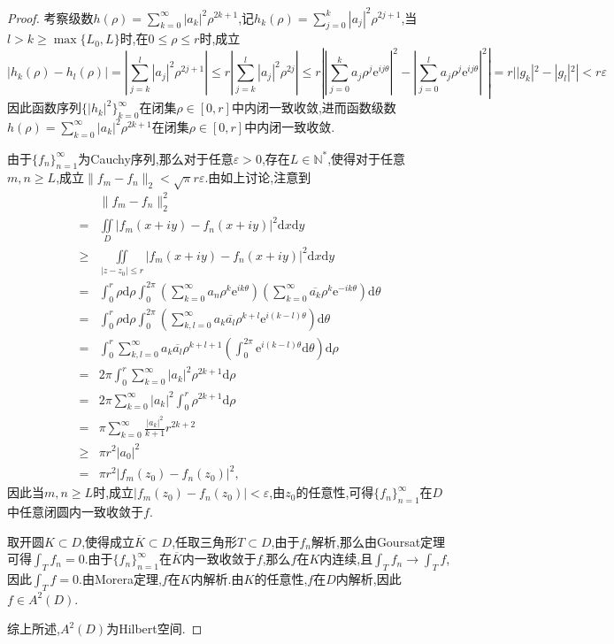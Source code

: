 \documentclass[lang = cn, scheme = chinese]{elegantbook}
\begin{document}
\begin{proof}
		考察级数$\displaystyle h(\rho)=\sum_{k=0}^{\infty}|a_k|^2\rho^{2k+1}$,记$\displaystyle h_k(\rho)=\sum_{j=0}^{k}|a_j|^2\rho^{2j+1}$,当$l>k\ge \max\{ L_0,L \}$时,在$0\le \rho \le r$时,成立
		$$
		|h_k(\rho)-h_l(\rho)|
		=\left| \sum_{j=k}^{l}|a_j|^2\rho^{2j+1} \right|
		\le r\left| \sum_{j=k}^{l}|a_j|^2\rho^{2j} \right|
		\le r\left| \left| \sum_{j=0}^{k}a_j\rho^j\mathrm{e}^{ij\theta} \right|^2-\left| \sum_{j=0}^{l}a_j\rho^j\mathrm{e}^{ij\theta} \right|^2 \right|
		= r||g_k|^2-|g_l|^2|<r\varepsilon
		$$
		因此函数序列$\{|h_k|^2\}_{k=0}^{\infty}$在闭集$\rho\in[0,r]$中内闭一致收敛,进而函数级数$\displaystyle h(\rho)=\sum_{k=0}^{\infty}|a_k|^2\rho^{2k+1}$在闭集$\rho\in[0,r]$中内闭一致收敛.
		
		由于$\{f_n\}_{n=1}^{\infty}$为Cauchy序列,那么对于任意$\varepsilon>0$,存在$L\in\mathbb{N}^*$,使得对于任意$m,n\ge L$,成立$\| f_m-f_n\|_2<\sqrt{\pi}r\varepsilon$.由如上讨论,注意到
		\begin{align*}
			&\|f_m-f_n\|_2^2\\
			=&\iint\limits_D |f_m(x+iy)-f_n(x+iy)|^2\mathrm{d}x\mathrm{d}y\\
			\ge & \iint\limits_{|z-z_0|\le r} |f_m(x+iy)-f_n(x+iy)|^2\mathrm{d}x\mathrm{d}y\\
			= & \int_0^r\rho\mathrm{d}\rho\int_0^{2\pi}\left(\sum_{k=0}^{\infty}a_n\rho^{k}\mathrm{e}^{ik\theta}\right)\left(\sum_{k=0}^{\infty}\overline{a_k}\rho^{k}\mathrm{e}^{-ik\theta}\right)\mathrm{d}\theta\\
			= & \int_0^r\rho\mathrm{d}\rho\int_0^{2\pi} \left(\sum_{k,l=0}^{\infty}a_k\overline{a_l}\rho^{k+l}\mathrm{e}^{i(k-l)\theta}\right)\mathrm{d}\theta\\
			= & \int_0^r\sum_{k,l=0}^{\infty}a_k\overline{a_l}\rho^{k+l+1}\left(\int_0^{2\pi} \mathrm{e}^{i(k-l)\theta}\mathrm{d}\theta\right)\mathrm{d}\rho\\
			= & 2\pi \int_0^r\sum_{k=0}^{\infty}|a_k|^{2}\rho^{2k+1}\mathrm{d}\rho\\
			= & 2\pi \sum_{k=0}^{\infty}|a_k|^{2}\int_0^r\rho^{2k+1}\mathrm{d}\rho\\
			= & \pi \sum_{k=0}^{\infty}\frac{|a_k|^2}{k+1}r^{2k+2}\\
			\ge & \pi r^2|a_0|^2\\
			= & \pi r^2|f_m(z_0)-f_n(z_0)|^2,
		\end{align*}
		因此当$m,n\ge L$时,成立$|f_m(z_0)-f_n(z_0)|<\varepsilon$,由$z_0$的任意性,可得$\{f_n\}_{n=1}^{\infty}$在$D$中任意闭圆内一致收敛于$f$.
		
		取开圆$K\subset D$,使得成立$\overline{K}\subset D$,任取三角形$T\subset D$,由于$f_n$解析,那么由Goursat定理可得$\displaystyle\int_T f_n=0$.由于$\{f_n\}_{n=1}^{\infty}$在$\overline{K}$内一致收敛于$f$,那么$f$在$K$内连续,且$\displaystyle\int_T f_n\to\int_T f$,因此$\displaystyle\int_T f=0$.由Morera定理,$f$在$K$内解析.由$K$的任意性,$f$在$D$内解析,因此$f\in A^2(D)$.
		
		综上所述,$A^2(D)$为Hilbert空间.
	\end{proof}
	
\end{document}
